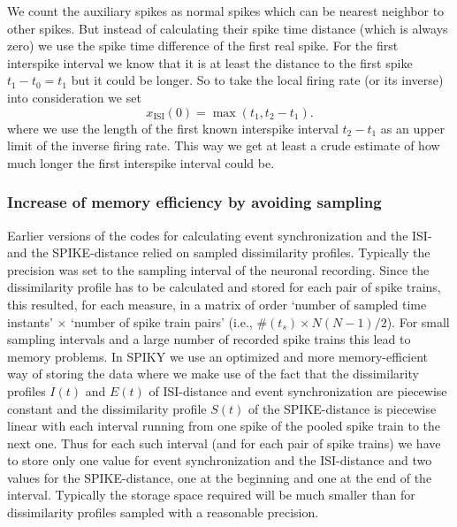 \documentclass[10pt,twocolumn]{elsart5p}
\begin{document}
\begin{appendix}
We count the auxiliary spikes as normal spikes which can be nearest neighbor to other spikes. But instead of calculating their spike time distance (which is always zero) we use the spike time difference of the first real spike. For the first interspike interval we know that it is at least the distance to the first spike $t_1-t_0 = t_1$ but it could be longer. So to take the local firing rate (or its inverse) into consideration we set
%
\begin{equation} \label{eq:Corrected-First-ISI}
    x_{\mathrm {ISI}} (0) = \max ( t_1, t_2 - t_1 ).
\end{equation}
%
where we use the length of the first known interspike interval $t_2-t_1$ as an upper limit of the inverse firing rate. This way we get at least a crude estimate of how much longer the first interspike interval could be.


\subsubsection{\label{App-sss:Sampling} Increase of memory efficiency by avoiding sampling}

Earlier versions of the codes for calculating event synchronization and the ISI- and the SPIKE-distance relied on sampled dissimilarity profiles. Typically the precision was set to the sampling interval of the neuronal recording. Since the dissimilarity profile has to be calculated and stored for each pair of spike trains, this resulted, for each measure, in a matrix of order `number of sampled time instants' $\times$ `number of spike train pairs' (i.e., $\# (t_s) \times N(N-1)/2$). For small sampling intervals and a large number of recorded spike trains this lead to memory problems.
In SPIKY we use an optimized and more memory-efficient way of storing the data where we make use of the fact that the dissimilarity profiles $I (t)$ and $E (t)$ of ISI-distance and event synchronization are piecewise constant and the dissimilarity profile $S (t)$ of the SPIKE-distance is piecewise linear with each interval running from one spike of the pooled spike train to the next one. Thus for each such interval (and for each pair of spike trains) we have to store only one value for event synchronization and the ISI-distance and two values for the SPIKE-distance, one at the beginning and one at the end of the interval. Typically the storage space required will be much smaller than for dissimilarity profiles sampled with a reasonable precision.


\end{appendix}
\end{document}
